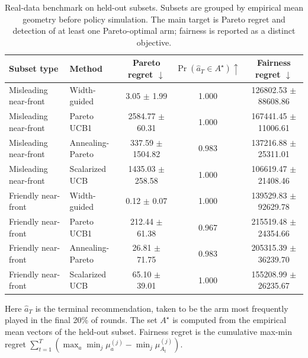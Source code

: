 \begin{table}[t]
\centering
\caption{Real-data benchmark on held-out subsets. Subsets are grouped by empirical mean geometry before policy simulation. The main target is Pareto regret and detection of at least one Pareto-optimal arm; fairness is reported as a distinct objective.}
\label{tab:real-main}
\scriptsize
\setlength{\tabcolsep}{3pt}
\begin{tabular}{llccc}
\toprule
Subset type & Method & Pareto regret $\downarrow$ & $\Pr(\widehat a_T\in A^\star)\uparrow$ & Fairness regret $\downarrow$ \\
\midrule
Misleading near-front & Width-guided & 3.05 $\pm$ 1.99 & 1.000 & 126802.53 $\pm$ 88608.86 \\
Misleading near-front & Pareto UCB1 & 2584.77 $\pm$ 60.31 & 1.000 & 167441.45 $\pm$ 11006.61 \\
Misleading near-front & Annealing-Pareto & 337.59 $\pm$ 1504.82 & 0.983 & 137216.88 $\pm$ 25311.01 \\
Misleading near-front & Scalarized UCB & 1435.03 $\pm$ 258.58 & 1.000 & 106619.47 $\pm$ 21408.46 \\
\midrule
Friendly near-front & Width-guided & 0.12 $\pm$ 0.07 & 1.000 & 139529.83 $\pm$ 92629.78 \\
Friendly near-front & Pareto UCB1 & 212.44 $\pm$ 61.38 & 0.967 & 215519.48 $\pm$ 24354.66 \\
Friendly near-front & Annealing-Pareto & 26.81 $\pm$ 71.75 & 0.983 & 205315.39 $\pm$ 36239.70 \\
Friendly near-front & Scalarized UCB & 65.10 $\pm$ 39.01 & 1.000 & 155208.99 $\pm$ 26235.67 \\
\bottomrule
\end{tabular}
\vspace{2pt}
\begin{minipage}{0.98\linewidth}
\scriptsize
Here $\widehat a_T$ is the terminal recommendation, taken to be the arm most frequently played in the final 20\% of rounds. The set $A^\star$ is computed from the empirical mean vectors of the held-out subset. Fairness regret is the cumulative max-min regret $\sum_{t=1}^T (\max_a \min_j \mu_a^{(j)} - \min_j \mu_{A_t}^{(j)})$.
\end{minipage}
\end{table}
